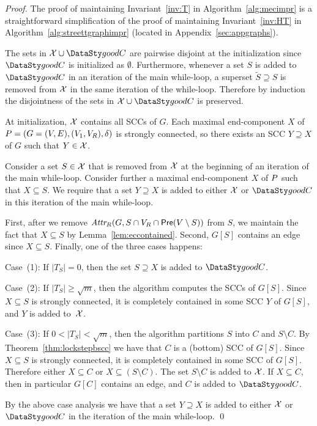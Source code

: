 \begin{proof}
\item 
\smallskip{}
The proof of maintaining Invariant~\ref{inv:T} in Algorithm~\ref{alg:mecimpr} is a
straightforward simplification of the proof of maintaining Invariant~\ref{inv:HT} in
Algorithm~\ref{alg:streettgraphimpr} (located in Appendix~\ref{sec:appgraphs}).

\smallskip{}
The sets in $\mathcal{\ec} \cup \goodC$ are pairwise disjoint at the
initialization since $\goodC$ is initialized as $\emptyset$. Furthermore,
whenever a set $S$ is added to $\goodC$ in an iteration of the main
while-loop, a superset $\tilde{S} \supseteq S$ is removed from
$\mathcal{X}$ in the same iteration of the while-loop. Therefore
by induction the disjointness of the sets in $\mathcal{\ec} \cup \goodC$
is preserved.

\smallskip{}
At initialization, $\mathcal{X}$ contains all SCCs of $G$.
Each maximal end-component $X$ of $P = (G = (V, E), \allowbreak(V_1, V_R), \allowbreak\delta)$
is strongly connected, so there exists an SCC $Y \supseteq X$ of $G$
such that $Y \in \mathcal{X}$.

Consider a set $S \in \mathcal{X}$ that is removed from $\mathcal{X}$
at the beginning of an iteration of the main while-loop. Consider further
a maximal end-component $X$ of $P$ such that $X \subseteq S$. We require
that a set $Y \supseteq X$ is added to either
$\mathcal{X}$ or $\goodC$ in this iteration of the main while-loop.

First, after we remove $\textit{Attr}_{R}(G, S \cap V_R \cap \mathsf{Pre}(V\setminus S))$ from $S$, we maintain the fact
that $X \subseteq S$ by Lemma~\ref{lem:eccontained}. Second, $G[S]$ contains an edge
since $X \subseteq S$. Finally, one of the three cases happens:

\smallskip\noindent Case~(1): If $\lvert T_S \rvert = 0$, then the set
$S \supseteq X$ is added to $\goodC$.

\smallskip\noindent Case~(2): If $\lvert T_S \rvert \ge \sqrt{m}$,
then the algorithm computes the SCCs of $G[S]$. Since $X \subseteq S$ is strongly connected,
it is completely contained in some SCC $Y$ of $G[S]$, and $Y$ is added to~$\mathcal{X}$.

\smallskip\noindent Case~(3): If $0 < \lvert T_S \rvert < \sqrt{m}$,
then the algorithm partitions $S$ into $C$ and $S \setminus C$. By Theorem~\ref{thm:lockstepbscc} we
have that $C$ is a (bottom) SCC of $G[S]$. Since $X \subseteq S$ is strongly connected, it is completely
contained in some SCC of $G[S]$. Therefore either $X \subseteq C$ or $X \subseteq (S \setminus C)$.
The set $S \setminus C$ is added to $\mathcal{X}$. If $X \subseteq C$, then in particular
$G[C]$ contains an edge, and $C$ is added to $\goodC$.

\smallskip\noindent By the above case analysis we have that a set $Y \supseteq X$ is added
to either $\mathcal{X}$ or $\goodC$ in the iteration of the main while-loop.
\qed
\end{proof}

